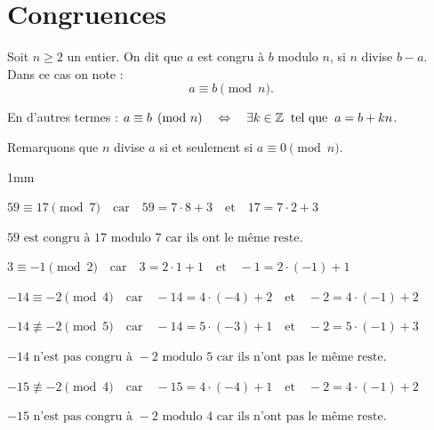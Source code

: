 \section{Congruences}




\begin{definition}
Soit $n \ge 2$ un entier. On dit que $a$ est congru à $b$ modulo $n$,
si $n$ divise $b-a$. Dans ce cas on note :
$$a \equiv b \pmod n.$$

En d'autres termes : $a \equiv b \pmod n \quad \ssi \quad \exists k \in \Z \eh{2}\textrm{tel que}\eh{2} a = b +kn$.
\end{definition}


Remarquons que $n$ divise $a$ si et seulement si $a\equiv 0 \pmod n$.

\vspace{3mm}

\begin{exemples}{1mm}
	\item $59 \equiv 17 \pmod 7 \quad \text{car} \quad 59 = 7 \cdot 8 + \boxed{3} \quad \text{et} \quad 17 = 7 \cdot 2 + \boxed{3}$
	
	$59 \text{ est congru à } 17 \text{ modulo } 7 \text{ car ils ont le même reste.}$
	
	\item $3 \equiv -1 \pmod 2 \quad \text{car} \quad 3 = 2 \cdot 1 + \boxed{1} \quad \text{et} \quad -1 = 2 \cdot (-1) + \boxed{1}$
	
	\item$-14 \equiv -2 \pmod 4 \quad \text{car} \quad -14 = 4 \cdot (-4) + \boxed{2} \quad \text{et} \quad -2 = 4 \cdot (-1) + \boxed{2}$
	
	\item $-14 \not\equiv -2 \pmod 5 \quad \text{car} \quad -14 = 5 \cdot (-3) + \boxed{1} \quad \text{et} \quad -2 = 5 \cdot (-1) + \boxed{3}$
	
	$-14 \text{ n'est pas congru à } -2 \text{ modulo } 5 \text{ car ils n'ont pas le même reste.}$
	
	
	\item $-15 \not\equiv -2 \pmod 4 \quad \text{car} \quad -15 = 4 \cdot (-4) + \boxed{1} \quad \text{et} \quad -2 = 4 \cdot (-1) + \boxed{2}$
	
	$-15 \text{ n'est pas congru à } -2 \text{ modulo } 4 \text{ car ils n'ont pas le même reste.}$
\end{exemples}


